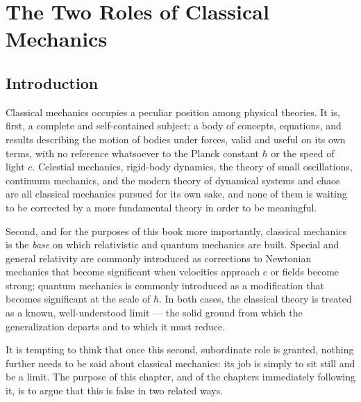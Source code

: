 \chapter{The Two Roles of Classical Mechanics}
\label{tr}

\section{Introduction}

Classical mechanics occupies a peculiar position among physical theories. It is,
first, a complete and self-contained subject: a body of concepts, equations, and
results describing the motion of bodies under forces, valid and useful on its own
terms, with no reference whatsoever to the Planck constant $\hbar$ or the speed of
light $c$. Celestial mechanics, rigid-body dynamics, the theory of small
oscillations, continuum mechanics, and the modern theory of dynamical systems and
chaos are all classical mechanics pursued for its own sake, and none of them is
waiting to be corrected by a more fundamental theory in order to be meaningful.

Second, and for the purposes of this book more importantly, classical mechanics is
the \emph{base} on which relativistic and quantum mechanics are built. Special and
general relativity are commonly introduced as corrections to Newtonian mechanics
that become significant when velocities approach $c$ or fields become strong;
quantum mechanics is commonly introduced as a modification that becomes significant
at the scale of $\hbar$. In both cases, the classical theory is treated as a known,
well-understood limit --- the solid ground from which the generalization departs
and to which it must reduce.

It is tempting to think that once this second, subordinate role is granted, nothing
further needs to be said about classical mechanics: its job is simply to sit still
and be a limit. The purpose of this chapter, and of the chapters immediately
following it, is to argue that this is false in two related ways.

